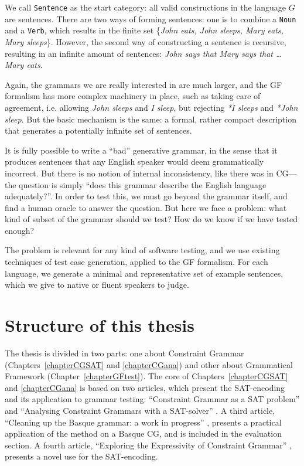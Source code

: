 We call \texttt{Sentence} as the start category: all valid constructions in the language $G$ are sentences. There are two ways of forming sentences: one is to combine a \texttt{Noun} and a \texttt{Verb}, which results in the finite set \{\emph{John eats, John sleeps, Mary eats, Mary sleeps}\}. However, the second way of constructing a sentence is recursive, resulting in an infinite amount of sentences: \emph{John says that Mary says that \dots Mary eats}.

Again, the grammars we are really interested in are much larger, and the GF formalism has more complex machinery in place, such as taking care of agreement, i.e. allowing \emph{John sleeps} and \emph{I sleep}, but rejecting \emph{*I sleeps} and \emph{*John sleep}. But the basic mechanism is the same: a formal, rather compact description that generates a potentially infinite set of sentences.

It is fully possible to write a ``bad'' generative grammar, in the sense that it produces sentences that any English speaker would deem grammatically incorrect. But there is no notion of internal inconsistency, like there was in CG---the question is simply ``does this grammar describe the English language adequately?''.
In order to test this, we must go beyond the grammar itself, and find a human oracle to answer the question.
But here we face a problem: what kind of subset of the grammar should we test? How do we know if we have tested enough?

The problem is relevant for any kind of software testing, and we use existing techniques of test case generation, applied to the GF formalism. For each language, we generate a minimal and representative set of example sentences, which we give to native or fluent speakers to judge.

\section{Structure of this thesis}

The thesis is divided in two parts: one about Constraint Grammar (Chapters~\ref{chapterCGSAT} and \ref{chapterCGana}) and other about Grammatical Framework (Chapter~\ref{chapterGFtest}). The core of Chapters~\ref{chapterCGSAT}  and \ref{chapterCGana} is based on two articles, which present the SAT-encoding and its application to grammar testing: ``Constraint Grammar as a SAT problem'' \cite{listenmaa_claessen2015}
and ``Analysing Constraint Grammars with a SAT-solver'' \cite{listenmaa_claessen2016}.
A third article, ``Cleaning up the Basque grammar: a work in progress'' \cite{listenmaa2017basque}, presents a practical application of the method on a Basque CG, and is included in the evaluation section.
A fourth article, ``Exploring the Expressivity of Constraint Grammar'' \cite{kokke2017expressivity}, presents a novel use for the SAT-encoding.

